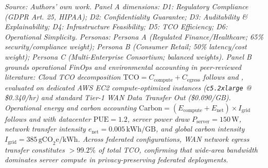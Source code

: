 \begin{table}[H]
\par\smallskip\raggedright\textit{Source: Authors' own work. Panel A dimensions: D1: Regulatory Compliance (GDPR Art. 25, HIPAA); D2: Confidentiality Guarantee; D3: Auditability \& Explainability; D4: Infrastructure Feasibility; D5: TCO Efficiency; D6: Operational Simplicity. Personas: Persona A (Regulated Finance/Healthcare; 65\% security/compliance weight); Persona B (Consumer Retail; 50\% latency/cost weight); Persona C (Multi-Enterprise Consortium; balanced weights). Panel B grounds operational FinOps and environmental accounting in peer-reviewed literature: Cloud TCO decomposition $\text{TCO} = C_{\text{compute}} + C_{\text{egress}}$ follows  and , evaluated on dedicated AWS EC2 compute-optimized instances (\texttt{c5.2xlarge} @ \$0.340/hr) and standard Tier-1 WAN Data Transfer Out (\$0.090/GB). Operational energy and carbon accounting $\text{Carbon} = (E_{\text{compute}} + E_{\text{net}}) \times I_{\text{grid}}$ follows  and  with datacenter $\text{PUE} = 1.2$, server power draw $P_{\text{server}} = 150\,\text{W}$, network transfer intensity $e_{\text{net}} = 0.005\,\text{kWh/GB}$, and global carbon intensity $I_{\text{grid}} = 385\,\text{gCO}_2\text{e/kWh}$. Across federated configurations, WAN network egress transfer constitutes $>99.2\%$ of total TCO, confirming that wide-area bandwidth dominates server compute in privacy-preserving federated deployments.}
\end{table}

\clearpage

